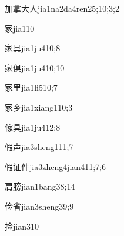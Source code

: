 \begin{verbete}{加拿大人}{jia1na2da4ren2}{5;10;3;2}
\end{verbete}

\begin{verbete}{家}{jia1}{10}
\end{verbete}

\begin{verbete}{家具}{jia1ju4}{10;8}
\end{verbete}

\begin{verbete}{家俱}{jia1ju4}{10;10}
\end{verbete}

\begin{verbete}{家里}{jia1li5}{10;7}
\end{verbete}

\begin{verbete}{家乡}{jia1xiang1}{10;3}
\end{verbete}

\begin{verbete}{傢具}{jia1ju4}{12;8}
\end{verbete}

\begin{verbete}{假声}{jia3sheng1}{11;7}
\end{verbete}

\begin{verbete}{假证件}{jia3zheng4jian4}{11;7;6}
\end{verbete}

\begin{verbete}{肩膀}{jian1bang3}{8;14}
\end{verbete}

\begin{verbete}{俭省}{jian3sheng3}{9;9}
\end{verbete}

\begin{verbete}{捡}{jian3}{10}
\end{verbete}

